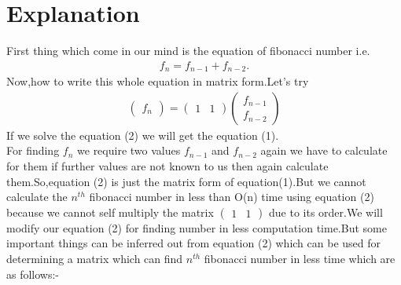 \documentclass[journal,12pt,twocolumn]{IEEEtran}
\begin{document}
\section{Explanation}
First thing which come in our mind is the equation of fibonacci number i.e.
\begin{align}
\boxed{f_n=f_{n-1} + f_{n-2}}.
\end{align}
Now,how to write this whole equation in matrix form.Let's try
\begin{align}
    \begin{pmatrix}f_n\end{pmatrix}=\begin{pmatrix}1 & 1\end{pmatrix}\begin{pmatrix}f_{n-1}\\f_{n-2}\end{pmatrix}
\end{align}
If we solve the equation (2) we will get the equation (1).\\
For finding $f_n$ we require two values $f_{n-1}$ and $f_{n-2}$ again we have to calculate for them if further values are not known to us then again calculate them.So,equation (2) is just the matrix form of equation(1).But we cannot calculate the $n^{th}$ fibonacci number in less than O(n) time using equation (2) because we cannot self multiply the matrix $\begin{pmatrix}1 & 1\end{pmatrix}$ due to its order.We will modify our equation (2) for finding number in less computation time.But some important things can be inferred out from equation (2) which can be used for determining a matrix which can find $n^{th}$ fibonacci number in less time which are as follows:-
\end{document}
